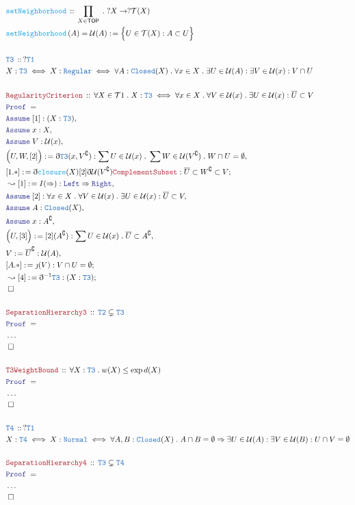 \documentclass[12pt]{scrartcl}
\newcommand{\TYPE}[1]{\textcolor{NavyBlue}{\mathtt{#1}}}
\newcommand{\FUNC}[1]{\textcolor{Cerulean}{\mathtt{#1}}}
\newcommand{\LOGIC}[1]{\textcolor{Blue}{\mathtt{#1}}}
\newcommand{\THM}[1]{\textcolor{Maroon}{\mathtt{#1}}}
\renewcommand{\.}{\; . \;}
\newcommand{\de}{: \kern 0.1pc =}
\newcommand{\Act}[1]{\left( #1 \right)}
\newcommand{\Theorem}[2]{& \THM{#1} \, :: \, #2 \\ & \Proof = \\ }
\newcommand{\DeclareType}[2]{& \TYPE{#1} \, :: \, #2 \\}
\newcommand{\DefineNamedType}[4]{& #1 : \TYPE{#2} \iff #3 \iff #4 \\}
\newcommand{\DeclareFunc}[2]{& \FUNC{#1} \, :: \, #2 \\}
\newcommand{\DefineNamedFunc}[4]{&  \FUNC{#1}\Act{#2} = #3 \de #4 \\}
\newcommand{\Page}[1]{ \begin{align*} #1 \end{align*}   }
\newcommand{ \bd }{ \ByDef }
\newcommand{\NoProof}{ & \ldots \\ \EndProof}
\newcommand{\Imply}{\Rightarrow}
\renewcommand{\c}{\complement}
\newcommand{\Say}[3]{& #1 \de #2 : #3, \\}
\newcommand{\Conclude}[3]{& #1 \de #2 : #3; \\}
\newcommand{\Derive}[3]{& \leadsto #1 \de #2 : #3, \\}
\newcommand{\DeriveConclude}[3]{& \leadsto #1 \de #2 : #3 ; \\}
\newcommand{\Assume}[2]{& \LOGIC{Assume} \; #1 : #2, \\}
\newcommand{\QED}{\; \square}
\newcommand{\EndProof}{& \QED \\}
\newcommand{\ByDef}{\eth}
\newcommand{\ByConstr}{\jmath}
\newcommand{\Proof}{\LOGIC{Proof} \; }
\newcommand{\TOP}{\mathsf{TOP}}
\newcommand{\T}{\mathcal{T}}
\renewcommand{\U}{\mathcal{U}}
\begin{document}
\Page{
	\DeclareFunc{setNeighborhood}{\prod_{X \in \TOP} \. ?X \to ?\T(X)}
	\DefineNamedFunc{setNeighborhood}{A}{\U(A)}{\Big\{ U \in \T(X) : A \subset U  \Big\}}
	\\
	\DeclareType{T3}{?\TYPE{T1}}
	\DefineNamedType{X}{T3}{X : \TYPE{Regular}}
	{
		\forall A : \TYPE{Closed}(X) \.
		\forall x \in X \.
		\exists U \in \U(A) :
		\exists V \in \U(x) :
		V \cap U
	}
	\\
	\Theorem{RegularityCriterion}{   
		\forall X \in \T1 \.
		X : \TYPE{T3} \iff 
		\forall x \in X \. \forall V \in \U(x) \. 
		\exists U \in \U(x) : \overline{U} \subset V
	}
	\Assume{[1]}{(X : \TYPE{T3})}
	\Assume{x}{X}
	\Assume{V}{\U(x)}
	\Say{\Big( U,W,[2] \Big)}{\bd \TYPE{T3}(x,V^\c)}
	{
		\sum U \in \U(x) \. \sum W \in \U(V^\c) \. W \cap U = \emptyset
	}
	\Conclude{ [1.*] }
	{
		\bd \FUNC{closure}(X)[2]\bd \U(V^\c) \THM{ComplementSubset}
	}
	{
		\overline{U} \subset W^\c \subset V
	}
	\Derive{ [1] }
	{ I(\Imply)  }{\LOGIC{Left} \Imply \LOGIC{Right}}
	\Assume{[2]}{   
		\forall x \in X \. \forall V \in \U(x) \. 
		\exists U \in \U(x) : \overline{U} \subset V	
	}
	\Assume{A}{\TYPE{Closed}(X)}
	\Assume{x}{A^\c}
	\Say{\Big( U, [3]\Big)}{[2](A^\c)}
	{
		\sum U \in \U(x) \. \overline{U} \subset A^\c
	}
	\Say{V}{\overline{U}^\c}{\U(A)}
	\Conclude{[A.*]}{\ByConstr(V)}{V \cap U = \emptyset} 
	\DeriveConclude{[4]}{\bd^{-1} \TYPE{T3}}{(X : \TYPE{T3})}
	\EndProof
	\\
	\Theorem{SeparationHierarchy3}
	{
		\TYPE{T2} \subsetneq \TYPE{T3}
	}
	\NoProof
	\\
	\Theorem{T3WeightBound}
	{
		\forall X : \TYPE{T3} \.
		w(X) \le \exp d(X)
	}
	\NoProof
	\\
	\DeclareType{T4}{?\TYPE{T1}}
	\DefineNamedType{X}{T4}{X : \TYPE{Normal}}
	{
		\forall A,B : \TYPE{Closed}(X) \.
		A \cap B = \emptyset 
		\Imply
		\exists U \in \U(A) :
		\exists V \in \U(B) :
		U \cap V = \emptyset
	}
	\\
	\Theorem{SeparationHierarchy4}
	{
		\TYPE{T3} \subsetneq \TYPE{T4}
	}
	\NoProof
}
\end{document}
